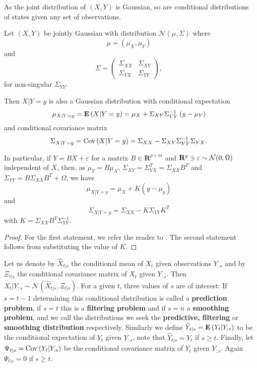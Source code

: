 As the joint distribution of $(X, Y)$ is Gaussian, so are conditional distributions of states given any set of observations.

\begin{lemma}
    \label{lem:gaussian_conditional}
    Let $(X,Y)$ be jointly Gaussian with distribution $\mathcal N \left( \mu, \Sigma \right)$ where 
    $$
    \mu = \left(\mu_{X}, \mu_{Y}\right)
    $$
    and 
    $$
    \Sigma = \begin{pmatrix}
        \Sigma_{XX} & \Sigma_{XY} \\
        \Sigma_{YX} & \Sigma_{YY}
    \end{pmatrix},
    $$
    for non-singular $\Sigma_{YY}$. 
    
    Then $X|Y = y$ is also a Gaussian distribution with conditional expectation
    $$
    \mu_{X|Y = y} = \mathbf E \left( X | Y = y \right) = \mu_{X} + \Sigma_{XY}\Sigma_{YY}^{-1} \left( y - \mu_{Y} \right)
    $$
    and conditional covariance matrix 
    $$
    \Sigma_{X| Y =y} = \text{Cov} \left( X | Y = y \right) = \Sigma_{XX} - \Sigma_{XY} \Sigma_{YY}^{-1} \Sigma_{YX}.
    $$
    
    In particular, if $Y = BX + \varepsilon$ for a matrix $B \in \mathbf R^{p\times m}$ and $\mathbf R^{p} \ni \varepsilon \sim \mathcal N(0, \Omega)$ independent of $X$, then, as 
    $\mu_Y = B \mu_{X}$, $\Sigma_{XY} = \Sigma_{YX}^T = \Sigma_{XX}B^{T}$ and $\Sigma_{YY} = B \Sigma_{XX} B^{T} + \Omega$, we have
    $$
        \mu_{X|Y = y} = \mu_{X} + K (y - \mu_{y})
    $$
    and 
    $$
    \Sigma_{X|Y = y} = \Sigma_{XX} - K \Sigma_{YY} K^{T}
    $$
    with $K = \Sigma_{XX}B^{T}\Sigma_{YY}^{-1}$.
\end{lemma}
\begin{proof}
    For the first statement, we refer the reader to \cite[Chapter 4, Lemma 1]{Durbin2012Time}. The second statement follows from substituting the value of $K$.
\end{proof}

Let us denote by $\hat X_{t | s}$ the conditional mean of $X_{t}$ given observations $Y_{:s}$ and by $\Xi_{t | s}$ the conditional covariance matrix of $X_{t}$ given $Y_{:s}$. Then $X_{t} | Y_{:s} \sim \mathcal N \left( \hat X_{t|s}, \Xi_{t|s} \right)$. For a given $t$, three values of $s$ are of interest: If $s = t - 1$ determining this conditional distribution is called a \textbf{prediction problem}, if $s = t$ this is a \textbf{filtering problem} and if $s = n$ a \textbf{smoothing problem}, and we call the distributions we seek the \textbf{predictive, filtering} or \textbf{smoothing distribution} respectively. 
Similarly we define $\hat Y_{t|s} = \mathbf E \left( Y_{t} \middle| Y_{:s} \right)$ to be the conditional expectation of $Y_{t}$ given $Y_{:s}$, note that $\hat Y_{t|s} = Y_{t}$ if $s \geq t$. Finally, let $\Psi_{t|s} = \text{Cov} \left( Y_{t} | Y_{:s} \right)$ be the conditional covariance matrix of $Y_{t}$ given $Y_{:s}$. Again $\Psi_{t|s} = 0$ if $s \geq t$. 

